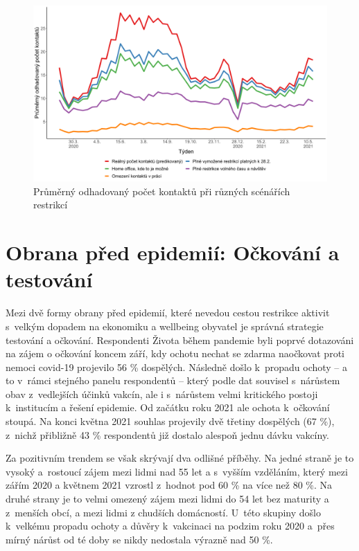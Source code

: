 \begin{figure}[ht]
    \centering
    \includegraphics[width=\textwidth]{./pic/zbp-graf5.png}
    \caption{Průměrný odhadovaný počet kontaktů při různých scénářích restrikcí}
    \label{fig:zbp5}
\end{figure}


\section*{Obrana před epidemií: Očkování a testování}

Mezi dvě formy obrany před epidemií, které nevedou cestou restrikce aktivit s velkým dopadem na ekonomiku a wellbeing obyvatel je správná strategie testování a očkování. Respondenti Života během pandemie byli poprvé dotazováni na zájem o očkování koncem září, kdy ochotu nechat se zdarma naočkovat proti nemoci covid-19 projevilo 56 \% dospělých. Následně došlo k propadu ochoty – a to v rámci stejného panelu respondentů – který podle dat souvisel s nárůstem obav z vedlejších účinků vakcín, ale i s nárůstem velmi kritického postoji k institucím a řešení epidemie. Od začátku roku 2021 ale ochota k očkování stoupá. Na konci května 2021 souhlas projevily dvě třetiny dospělých (67 \%), z nichž přibližně 43 \% respondentů již dostalo alespoň jednu dávku vakcíny. 

Za pozitivním trendem se však skrývají dva odlišné příběhy. Na jedné straně je to vysoký a rostoucí zájem mezi lidmi nad 55 let a s vyšším vzděláním, který mezi zářím 2020 a květnem 2021 vzrostl z hodnot pod 60 \% na více než 80 \%. Na druhé strany je to velmi omezený zájem mezi lidmi do 54 let bez maturity a z menších obcí, a mezi lidmi z chudších domácností. U této skupiny došlo k velkému propadu ochoty a důvěry k vakcinaci na podzim roku 2020 a přes mírný nárůst od té doby se nikdy nedostala výrazně nad 50 \%. 

